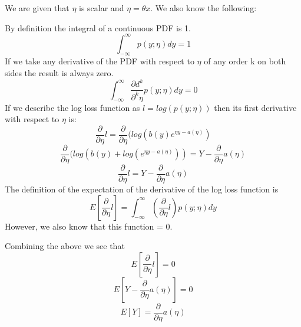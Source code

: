 \begin{answer}

We are given that $\eta$ is scalar and $\eta = \theta x$. We also know the following:

By definition the integral of a continuous PDF is 1.
    \begin{equation}
        \int_{-\infty}^{\infty} p(y;\eta) dy = 1
    \end{equation}
If we take any derivative of the PDF with respect to $\eta$ of any order k on both sides the result is always zero. \label{eq:derivate_zero}
    \begin{equation}
         \int_{-\infty}^{\infty} \frac{\partial d^k}{\partial ^k\eta} p(y;\eta) dy = 0
    \end{equation}
If we describe the log loss function as $l = log(p(y;\eta))$ then its first derivative with respect to $\eta$ is:
    \begin{equation}
        \frac{\partial}{\partial\eta}l = \frac{\partial}{\partial\eta}(log(b(y)e^{\eta y - a(\eta)}) 
    \end{equation}
    \begin{equation}
        \frac{\partial}{\partial\eta}(log(b(y) + log(e^{\eta y - a(\eta)})) = Y - \frac{\partial}{\partial\eta} a(\eta)
    \end{equation}
    \begin{equation} \label{eq:l'}
        \frac{\partial}{\partial\eta}l = Y - \frac{\partial}{\partial\eta} a(\eta)
    \end{equation}
The definition of the expectation of the derivative of the log loss function is
    \begin{equation}
        E[\frac{\partial}{\partial\eta}l] = \int_{-\infty}^{\infty} (\frac{\partial}{\partial\eta}l) p(y;\eta) dy
    \end{equation} However, we also know that this function = 0.


Combining the above we see that
\begin{equation}
    E[ \frac{\partial}{\partial\eta}l]  = 0
\end{equation}
\begin{equation}
    E[Y - \frac{\partial}{\partial\eta} a(\eta)] = 0
\end{equation}
\begin{equation}
    E[Y] = \frac{\partial}{\partial\eta} a(\eta)
\end{equation}


\end{answer}
